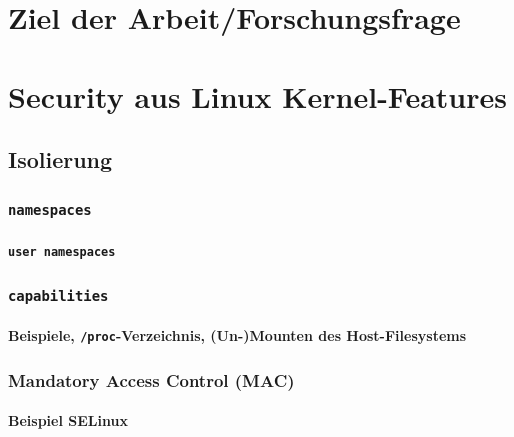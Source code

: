 \documentclass[11pt,a4paper,oneside]{report}
\begin{document}

\chapter{Ziel der Arbeit/Forschungsfrage}
\chapter{Security aus Linux Kernel-Features}
	\section{Isolierung}
		\subsection{\texttt{namespaces}}
			\subsubsection{\texttt{user namespaces}}
		\subsection{\texttt{capabilities}}
			\subsubsection{Beispiele, \texttt{/proc}-Verzeichnis, (Un-)Mounten des Host-Filesystems}
		\subsection{Mandatory Access Control (MAC)}
			\subsubsection{Beispiel SELinux}
\end{document}

